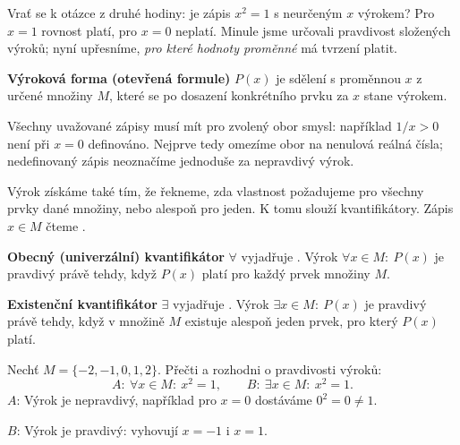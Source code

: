\documentclass[11pt,a4paper]{article}
\begin{document}
Vrať se k otázce z druhé hodiny: je zápis $x^2=1$ s neurčeným $x$
výrokem? Pro $x=1$ rovnost platí, pro $x=0$ neplatí. Minule jsme
určovali pravdivost složených výroků; nyní upřesníme, \emph{pro které
hodnoty proměnné} má tvrzení platit.

\begin{definiceBox}[title={Definice - Výroková forma}]
\textbf{Výroková forma (otevřená formule)} $P(x)$ je sdělení
s proměnnou $x$ z určené množiny $M$, které se po dosazení konkrétního
prvku za $x$ stane výrokem.
\end{definiceBox}

Všechny uvažované zápisy musí mít pro zvolený obor smysl:
například $1/x>0$ není při $x=0$ definováno.
Nejprve tedy omezíme obor na nenulová reálná čísla;
nedefinovaný zápis neoznačíme jednoduše za nepravdivý výrok.

Výrok získáme také tím, že řekneme, zda vlastnost požadujeme pro všechny
prvky dané množiny, nebo alespoň pro jeden. K tomu slouží kvantifikátory.
Zápis $x\in M$ čteme .

\begin{definiceBox}[title={Definice - Obecný kvantifikátor}]
\textbf{Obecný (univerzální) kvantifikátor} $\forall$ vyjadřuje
. Výrok $\forall x\in M:\ P(x)$ je pravdivý právě tehdy,
když $P(x)$ platí pro každý prvek množiny $M$.
\end{definiceBox}

\begin{definiceBox}[title={Definice - Existenční kvantifikátor}]
\textbf{Existenční kvantifikátor} $\exists$ vyjadřuje
. Výrok $\exists x\in M:\ P(x)$ je pravdivý
právě tehdy, když v množině $M$ existuje alespoň jeden prvek, pro který
$P(x)$ platí.
\end{definiceBox}

\begin{prikladReseniBox}[title={Příklad 1}]
Nechť $M=\{-2,-1,0,1,2\}$. Přečti a rozhodni o pravdivosti výroků:
\[
 A:\ \forall x\in M:\ x^2=1,
 \qquad
 B:\ \exists x\in M:\ x^2=1.
\]
\tcblower
$A$:  Výrok je nepravdivý,
například pro $x=0$ dostáváme $0^2=0\ne1$.

$B$: 
Výrok je pravdivý: vyhovují $x=-1$ i $x=1$.
\end{prikladReseniBox}
\end{document}
